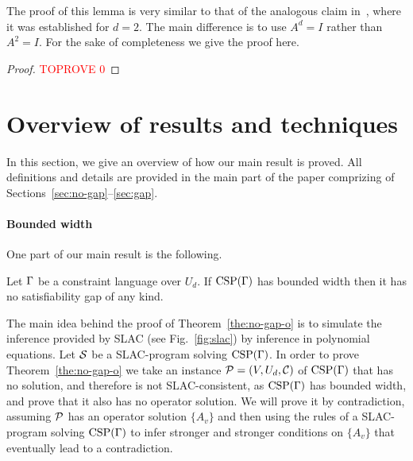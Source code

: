 \documentclass[11pt,letter]{article}
\begin{document}
The proof of this lemma is very similar to that of the analogous claim
in~\cite[Lemma~3]{AKS19:jcss}, where it was established for $d=2$.
The main difference is to 
use $A^d=I$ rather than $A^2=I$. For the sake of completeness we give the proof here.

\noindent\begin{proof}\textcolor{red}{TOPROVE 0}\end{proof}

 
 

\section{Overview of results and techniques}

In this section, we give an overview of how our main result is proved. All
definitions and details are provided in the main part of the paper comprizing of
Sections~\ref{sec:no-gap}--\ref{sec:gap}.

\paragraph{Bounded width}

One part of our main result is the following.

\begin{theorem}\label{the:no-gap-o}
Let $\Gamma$ be a constraint language over $U_d$. If ${\rm CSP}(\Gamma)$ has bounded
width then it has no satisfiability gap of any kind.
\end{theorem}

The main idea behind the proof of Theorem~\ref{the:no-gap-o} 
is to simulate the inference provided by SLAC (see Fig.~\ref{fig:slac}) 
by inference in polynomial equations. Let ${\mathcal S}$ be a SLAC-program solving ${\rm CSP}(\Gamma)$.
In order to prove Theorem~\ref{the:no-gap-o} we take an instance ${\mathcal P}=(V,U_d,{\mathcal C})$ of ${\rm CSP}(\Gamma)$ that has no solution, and therefore  is not SLAC-consistent, as ${\rm CSP}(\Gamma)$ has bounded width, and prove that it also has no operator solution. We will prove it by contradiction, assuming ${\mathcal P}$ has an operator solution $\{A_v\}$ and then using the rules of a SLAC-program solving ${\rm CSP}(\Gamma)$ to infer stronger and stronger conditions on $\{A_v\}$ that eventually lead to a contradiction. 
\end{document}
